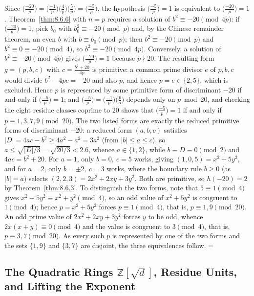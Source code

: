\documentclass[11pt]{article}
\makeatletter
\let\nt@closedisplay\]
\def\nt@guardedclose{\@ifnextchar\par{\nt@closeafterpar}{\@ifnextchar\end{\postdisplaypenalty\@M\nt@closedisplay}{\nt@closedisplay}}}
\def\nt@closeafterpar\par{\@ifnextchar\par{\nt@closeafterpar}{\@ifnextchar\end{\postdisplaypenalty\@M\nt@closedisplay\par}{\nt@closedisplay\par}}}
\renewenvironment{proof}[1][\proofname]{\par
  \pushQED{\qed}\normalfont\topsep\medskipamount\edef\nt@afterproof{\@endparpenalty=\the\@endparpenalty\relax}\@beginparpenalty\@M\@endparpenalty\@M\let\]\nt@guardedclose\trivlist\item[]\textit{#1\@addpunct{.}} \ignorespaces}{\ifvmode\addpenalty\@M\fi\popQED\nt@afterproof\endtrivlist\@endpefalse}
\theoremstyle{ntstyle}
\newcommand{\legs}[2]{\bigl(\tfrac{#1}{#2}\bigr)}
\makeatother
\begin{document}
\begin{proof} Since $\legs{-20}{p} = \legs{-1}{p}\legs{4}{p}\legs{5}{p} = \legs{-5}{p}$, the hypothesis $\legs{-5}{p} = 1$ is equivalent to
  $\legs{-20}{p} = 1$. Theorem~\ref{thm:8.6.6} with $n = p$ requires a solution of
  $b^{2} \equiv -20 \pmod{4p}$: if $\legs{-20}{p} = 1$, pick $b_0$ with
  $b_0^{2} \equiv -20 \pmod{p}$ and, by the Chinese remainder theorem,
  an even $b$ with $b \equiv b_0 \pmod{p}$; then $b^{2} \equiv -20 \pmod{p}$ and
  $b^{2} \equiv 0 \equiv -20 \pmod{4}$, so $b^{2} \equiv -20 \pmod{4p}$. Conversely, a solution of
  $b^{2} \equiv -20 \pmod{4p}$
  gives $\legs{-20}{p} = 1$ because $p \nmid 20$. The resulting form
  $g = (p, b, c)$ with $c = \tfrac{b^{2}+20}{4p}$ is primitive: a common
  prime divisor $e$ of $p, b, c$ would divide $b^{2} - 4pc = -20$ and
  also $p$, and hence $p = e \in \{2, 5\}$, which is excluded. Hence $p$ is
  represented by some primitive form of discriminant $-20$ if and only if
  $\legs{-5}{p} = 1$; and $\legs{-5}{p} = \legs{-1}{p}\legs{p}{5}$ depends only on
  $p \bmod 20$, and checking the eight residue classes coprime to $20$ shows that
  $\legs{-5}{p} = 1$ if and only if $p \equiv 1, 3, 7, 9 \pmod{20}$.
  The two listed forms are exactly the reduced primitive forms of
  discriminant $-20$: a reduced form $(a,b,c)$ satisfies $|D| = 4ac - b^2 \ge 4a^2 - a^2 = 3a^2$ (from
  $|b| \le a \le c$), so $a \le \sqrt{|D|/3} = \sqrt{20/3} < 2.6$, whence $a \in \{1, 2\}$, while
  $b \equiv D \equiv 0 \pmod{2}$ and $4ac = b^{2} + 20$. For
  $a = 1$, only $b = 0,\ c = 5$ works, giving $(1, 0, 5) = x^{2} + 5y^{2}$, and for $a = 2$, only
  $b = \pm 2,\ c = 3$ works, where the
  boundary rule $b \ge 0$ (as $|b| = a$) selects $(2, 2, 3) = 2x^{2} + 2xy + 3y^{2}$. Both are primitive, so
  $h(-20) = 2$ by Theorem~\ref{thm:8.6.3}.
  To distinguish the two forms, note that $5 \equiv 1 \pmod{4}$ gives
  $x^{2} + 5y^{2} \equiv x^{2} + y^{2} \pmod{4}$, so an odd value of $x^{2} + 5y^{2}$ is
  congruent to $1 \pmod{4}$; hence $p = x^{2} + 5y^{2}$ forces $p \equiv 1 \pmod{4}$, that is,
  $p \equiv 1, 9 \pmod{20}$. An odd prime value of
  $2x^{2} + 2xy + 3y^{2}$ forces $y$ to be odd, whence $2x(x + y) \equiv 0 \pmod{4}$ and the value is congruent to
  $3 \pmod{4}$, that is, $p \equiv 3, 7 \pmod{20}$. As every such $p$ is represented by one of the two forms
  and the sets $\{1, 9\}$ and $\{3, 7\}$ are disjoint, the three equivalences
  follow.
\end{proof}
\subsection{The Quadratic Rings \texorpdfstring{$\mathbb{Z}[\sqrt{d}]$}{Z[sqrt d]}, Residue Units, and Lifting the
Exponent}\label{subsec:8.7}
\end{document}
